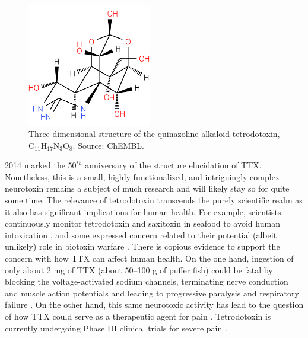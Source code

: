 \begin{figure}
    \centering
    \vspace{-\intextsep}\hspace*{-.75\columnsep}
    \includegraphics[width=0.48\textwidth]{figs/tetrodotoxin.png}
    \caption{Three-dimensional structure of the quinazoline alkaloid tetrodotoxin, C$_{11}$H$_{17}$N$_{3}$O$_{8}$. Source: ChEMBL.}
    \label{fig:ttx}
\end{figure}

2014 marked the 50$^{th}$ anniversary of the structure elucidation of TTX. Nonetheless, this is a small, highly functionalized, and intriguingly complex neurotoxin remains a subject of much research and will likely stay so for quite some time. The relevance of tetrodotoxin transcends the purely scientific realm as it also has significant implications for human health. For example, scientists continuously monitor tetrodotoxin and saxitoxin in seafood to avoid human intoxication \citep{berlinck2016chemistry}, and some expressed concern related to their potential (albeit unlikely) role in biotoxin warfare \citep[e.g.,][]{gorka2002biological, zhang2014effects, de2017neurological}. There is copious evidence to support the concern with how TTX can affect human health. On the one hand, ingestion of only about 2 mg of TTX (about 50–100 g of puffer fish) could be fatal by blocking the voltage-activated sodium channels, terminating nerve conduction and muscle action potentials and leading to progressive paralysis and respiratory failure \citep{de2017neurological}. On the other hand, this same neurotoxic activity has lead to the question of how TTX could serve as a therapeutic agent for pain \citep{nieto2012tetrodotoxin}. Tetrodotoxin is currently undergoing Phase III clinical trials for severe pain \citep{hagen2017tetrodotoxin}.

